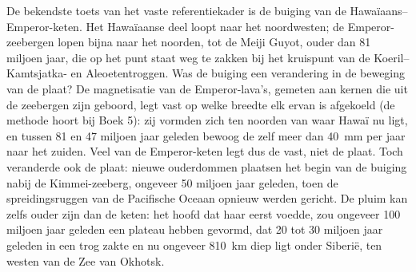 De bekendste toets van het vaste referentiekader is de buiging van de Hawaïaans–Emperor-keten. Het Hawaïaanse deel loopt naar het noordwesten; de Emperor-zeebergen lopen bijna naar het noorden, tot de Meiji Guyot, ouder dan 81 miljoen jaar, die op het punt staat weg te zakken bij het kruispunt van de Koeril–Kamtsjatka- en Aleoetentroggen. Was de buiging een verandering in de beweging van de plaat? De magnetisatie van de Emperor-lava's, gemeten aan kernen die uit de zeebergen zijn geboord, legt vast op welke breedte elk ervan is afgekoeld (de methode hoort bij Boek 5): zij vormden zich ten noorden van waar Hawaï nu ligt, en tussen 81 en 47 miljoen jaar geleden bewoog de  zelf meer dan \qty{40}{mm} per jaar naar het zuiden. Veel van de Emperor-keten legt dus de  vast, niet de plaat. Toch veranderde ook de plaat: nieuwe ouderdommen plaatsen het begin van de buiging nabij de Kimmei-zeeberg, ongeveer 50 miljoen jaar geleden, toen de spreidingsruggen van de Pacifische Oceaan opnieuw werden gericht. De pluim kan zelfs ouder zijn dan de keten: het hoofd dat haar eerst voedde, zou ongeveer 100 miljoen jaar geleden een plateau hebben gevormd, dat 20 tot 30 miljoen jaar geleden in een trog zakte en nu ongeveer \qty{810}{km} diep ligt onder Siberië, ten westen van de Zee van Okhotsk.

